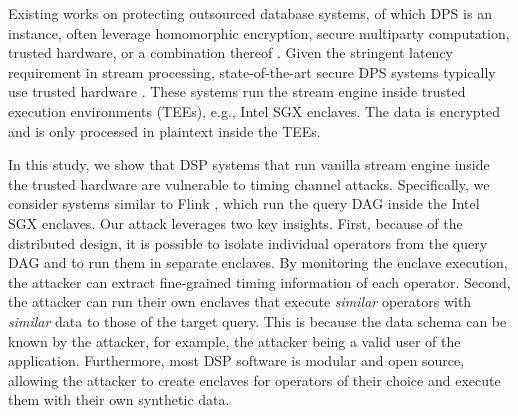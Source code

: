 
Existing works on protecting outsourced database systems, of which DPS is an instance, often leverage homomorphic encryption, secure multiparty computation, 
trusted hardware, or a combination thereof \cite{schuster2015vc3, popa2011cryptdb,reijsbergen2023tap,dinh2015m2r,zhang2015integridb}.
%
Given the stringent latency requirement
in stream processing, state-of-the-art secure DPS systems typically use trusted hardware  \cite{DBLP:journals/corr/abs-1805-01752,
234964,schuster2015vc3, dauterman2022waldo}. These systems run the stream engine inside trusted execution environments (TEEs), e.g., Intel SGX enclaves. 
%
The data is encrypted and is only processed in plaintext inside the TEEs.

In this study, we show that DSP systems that run vanilla stream engine inside the trusted hardware are vulnerable to
timing channel attacks. Specifically, we consider systems similar to Flink \cite{carbone2015apache}, which run the query DAG inside the 
Intel SGX enclaves. Our attack leverages two key insights. 
%
First, because of the distributed design, it is possible to
isolate individual operators from the query DAG and to run them in separate enclaves. 
%
By monitoring the enclave
execution, the attacker can extract fine-grained timing information of each operator. Second, the attacker can run their
own enclaves that execute {\em similar} operators with {\em similar} data to those of the target query. This is because
the data schema can be known by the attacker, for example, the attacker being a valid user of the application.
Furthermore, most DSP software is modular and open source, allowing the attacker to create enclaves for operators of
their choice and execute them with their own synthetic data.

